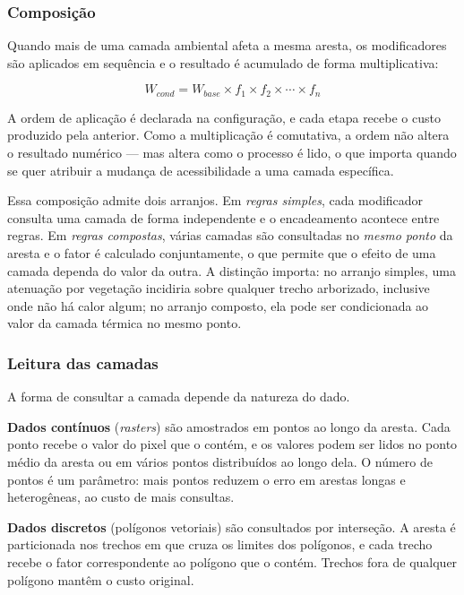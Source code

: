\subsubsection{Composição}

Quando mais de uma camada ambiental afeta a mesma aresta, os modificadores são
aplicados em sequência e o resultado é acumulado de forma multiplicativa:

\begin{equation}
  W_{cond} = W_{base} \times f_1 \times f_2 \times \cdots \times f_n
\end{equation}

A ordem de aplicação é declarada na configuração, e cada etapa recebe o custo
produzido pela anterior. Como a multiplicação é comutativa, a ordem não altera o
resultado numérico — mas altera como o processo é lido, o que importa quando se
quer atribuir a mudança de acessibilidade a uma camada específica.

Essa composição admite dois arranjos. Em \emph{regras simples}, cada modificador
consulta uma camada de forma independente e o encadeamento acontece entre regras.
Em \emph{regras compostas}, várias camadas são consultadas no \emph{mesmo ponto}
da aresta e o fator é calculado conjuntamente, o que permite que o efeito de uma
camada dependa do valor da outra. A distinção importa: no arranjo simples, uma
atenuação por vegetação incidiria sobre qualquer trecho arborizado, inclusive onde
não há calor algum; no arranjo composto, ela pode ser condicionada ao valor da
camada térmica no mesmo ponto.

\subsubsection{Leitura das camadas}

A forma de consultar a camada depende da natureza do dado.

\textbf{Dados contínuos} (\textit{rasters}) são amostrados em pontos ao longo da
aresta. Cada ponto recebe o valor do pixel que o contém, e os valores podem ser
lidos no ponto médio da aresta ou em vários pontos distribuídos ao longo dela. O
número de pontos é um parâmetro: mais pontos reduzem o erro em arestas longas e
heterogêneas, ao custo de mais consultas.

\textbf{Dados discretos} (polígonos vetoriais) são consultados por interseção. A
aresta é particionada nos trechos em que cruza os limites dos polígonos, e cada
trecho recebe o fator correspondente ao polígono que o contém. Trechos fora de
qualquer polígono mantêm o custo original.

